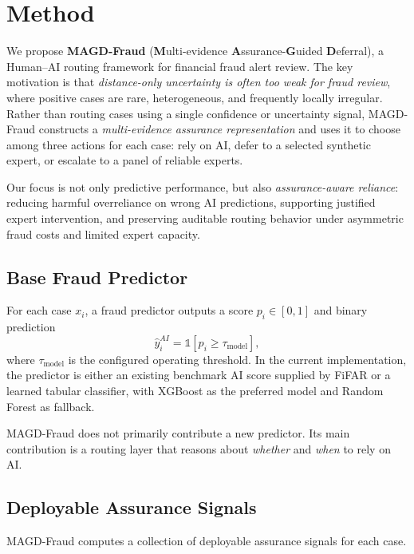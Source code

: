 \section{Method}
\label{sec:method}

We propose \textbf{MAGD-Fraud} (\textbf{M}ulti-evidence \textbf{A}ssurance-\textbf{G}uided \textbf{D}eferral), a Human--AI routing framework for financial fraud alert review. The key motivation is that \emph{distance-only uncertainty is often too weak for fraud review}, where positive cases are rare, heterogeneous, and frequently locally irregular. Rather than routing cases using a single confidence or uncertainty signal, MAGD-Fraud constructs a \emph{multi-evidence assurance representation} and uses it to choose among three actions for each case: rely on AI, defer to a selected synthetic expert, or escalate to a panel of reliable experts.

Our focus is not only predictive performance, but also \emph{assurance-aware reliance}: reducing harmful overreliance on wrong AI predictions, supporting justified expert intervention, and preserving auditable routing behavior under asymmetric fraud costs and limited expert capacity.

\subsection{Base Fraud Predictor}
\label{subsec:base_predictor}

For each case $x_i$, a fraud predictor outputs a score $p_i \in [0,1]$ and binary prediction
\begin{equation}
\hat{y}^{AI}_i = \mathbb{1}[p_i \ge \tau_{\text{model}}],
\end{equation}
where $\tau_{\text{model}}$ is the configured operating threshold. In the current implementation, the predictor is either an existing benchmark AI score supplied by FiFAR or a learned tabular classifier, with XGBoost as the preferred model and Random Forest as fallback.

MAGD-Fraud does not primarily contribute a new predictor. Its main contribution is a routing layer that reasons about \emph{whether} and \emph{when} to rely on AI.

\subsection{Deployable Assurance Signals}
\label{subsec:assurance_signals}

MAGD-Fraud computes a collection of deployable assurance signals for each case.

